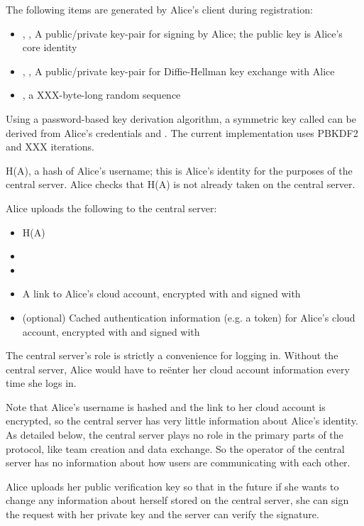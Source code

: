 \documentclass[pldi,10pt]{sigplanconf-pldi16}
\begin{document}
The following items are generated by Alice's client during registration:

\begin{itemize}
\item {}, , A public/private key-pair for signing by Alice; the public key is Alice's core identity
\item {}, , A public/private key-pair for Diffie-Hellman key exchange with Alice
\item {}, a XXX-byte-long random sequence
\end{itemize}

Using a password-based key derivation algorithm, a symmetric key called  can be derived from Alice's credentials and .
The current implementation uses PBKDF2 and XXX iterations.

H(A), a hash of Alice's username; this is Alice's identity for the purposes of the central server.
Alice checks that H(A) is not already taken on the central server.

Alice uploads the following to the central server:

\begin{itemize}
\item H(A)
\item {}
\item {}
\item A link to Alice's cloud account, encrypted with  and signed with 
\item (optional) Cached authentication information (e.g. a token) for Alice's cloud account, encrypted with  and signed with 
\end{itemize}

The central server's role is strictly a convenience for logging in.
Without the central server, Alice would have to re\"{e}nter her cloud account information every time she logs in.

Note that Alice's username is hashed and the link to her cloud account is encrypted, so the central server has very little information about Alice's identity.
As detailed below, the central server plays no role in the primary parts of the protocol, like team creation and data exchange.
So the operator of the central server has no information about how users are communicating with each other.

Alice uploads her public verification key so that in the future if she wants to change any information about herself stored on the central server, she can sign the request with her private key and the server can verify the signature.
\end{document}

